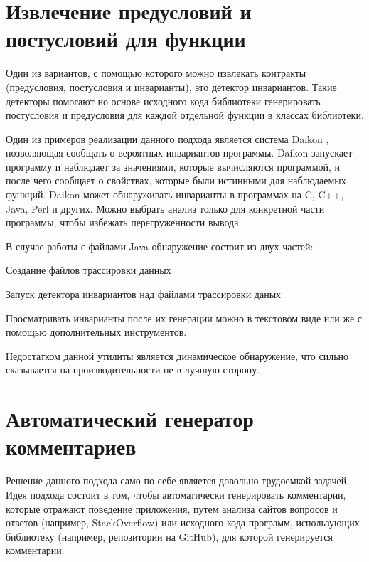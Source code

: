 \section{Извлечение предусловий и постусловий для функции}

Один из вариантов, с помощью которого можно извлекать контракты (предусловия, постусловия и инварианты), это детектор инвариантов. Такие детекторы помогают но основе исходного кода библиотеки генерировать постусловия и предусловия для каждой отдельной функции в классах библиотеки.

Один из примеров реализации данного подхода является система Daikon \cite{daikon} \cite{daikon_paper}, позволяющая сообщать о вероятных инвариантов программы. Daikon запускает программу и наблюдает за значениями, которые вычисляются программой, и после чего сообщает о свойствах, которые были истинными для наблюдаемых функций.
Daikon может обнаруживать инварианты в программах на C, C++, Java, Perl и других. Можно выбрать анализ только для конкретной части программы, чтобы избежать перегруженности вывода.

В случае работы с файлами Java обнаружение состоит из двух частей:
%
\begin{itemize*}
\item Создание файлов трассировки данных
\item Запуск детектора инвариантов над файлами трассировки даных
\end{itemize*}
%
Просматривать инварианты после их генерации можно в текстовом виде или же с помощью дополнительных инструментов.

Недостатком данной утилиты является динамическое обнаружение, что сильно сказывается на производительности не в лучшую сторону.

\section{Автоматический генератор комментариев}

Решение данного подхода само по себе является довольно трудоемкой задачей.
Идея подхода состоит в том, чтобы автоматически генерировать комментарии, которые отражают поведение приложения, путем анализа сайтов вопросов и ответов (например, StackOverflow) или исходного кода программ, использующих библиотеку (например, репозитории на GitHub), для которой генерируется комментарии.

